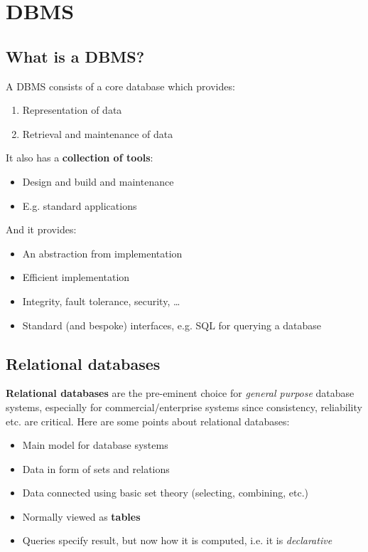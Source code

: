 \chapter{DBMS}
\section{What is a DBMS?}
A DBMS consists of a core database which provides:

\begin{enumerate}
	\item Representation of data
	\item Retrieval and maintenance of data
\end{enumerate}

It also has a \textbf{collection of tools}:
\begin{itemize}
	\item Design and build and maintenance
	\item E.g. standard applications
\end{itemize}

And it provides:
\begin{itemize}
	\item An abstraction from implementation
	\item Efficient implementation
	\item Integrity, fault tolerance, security, \ldots
	\item Standard (and bespoke) interfaces, e.g. SQL for querying a database
\end{itemize}

\section{Relational databases}
\textbf{Relational databases} are the pre-eminent choice for \textit{general purpose} database systems, especially for commercial/enterprise systems since consistency, reliability etc. are critical.
\medskip
Here are some points about relational databases:
\begin{itemize}
	\item Main model for database systems
	\item Data in form of sets and relations
	\item Data connected using basic set theory (selecting, combining, etc.)
	\item Normally viewed as \textbf{tables}
	\item Queries specify result, but now how it is computed, i.e. it is \textit{declarative}
\end{itemize}

